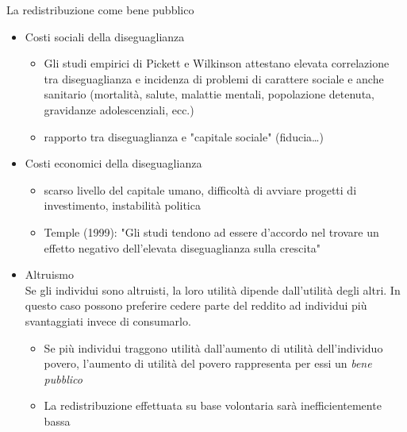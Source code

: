 \documentclass[aspectratio=64,11pt]{beamer}
\begin{document}
\begin{frame}{La redistribuzione come bene pubblico}
\begin{itemize}
\item \alert{Costi sociali della diseguaglianza}\\[0pt]
\begin{itemize}
\item Gli studi empirici di Pickett e Wilkinson attestano elevata correlazione
tra diseguaglianza e incidenza di problemi di carattere sociale e anche
sanitario (mortalità, salute, malattie mentali, popolazione detenuta,
gravidanze adolescenziali, ecc.)
\item rapporto tra diseguaglianza e "capitale sociale" (fiducia\ldots{})
\end{itemize}

\item \alert{Costi economici della diseguaglianza}\\[0pt]
\begin{itemize}
\item scarso livello del capitale umano, difficoltà di avviare progetti di
investimento, instabilità politica
\item Temple (1999): "Gli studi tendono ad essere d'accordo nel trovare un
effetto negativo dell'elevata diseguaglianza sulla crescita"
\end{itemize}

\item \alert{Altruismo}\\[0pt]
Se gli individui sono altruisti, la loro utilità dipende dall'utilità degli
altri. In questo caso possono preferire cedere parte del reddito ad
individui più svantaggiati invece di consumarlo.
\begin{itemize}
\item Se più individui traggono utilità dall'aumento di utilità dell'individuo
povero, l'aumento di utilità del povero rappresenta per essi un \emph{bene
pubblico}
\item La redistribuzione effettuata su base
volontaria sarà inefficientemente bassa
\end{itemize}
\end{itemize}
\end{frame}
\end{document}
